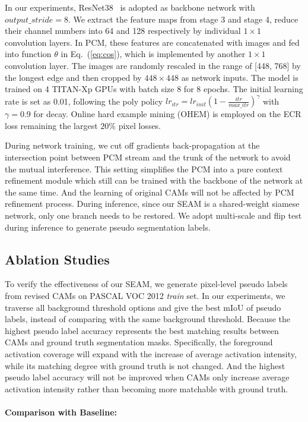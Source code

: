 \documentclass[10pt,twocolumn,letterpaper]{article}
\begin{document}
	In our experiments, ResNet38~\cite{resnet38} is adopted as backbone network with $output\_stride=8$. We extract the feature maps from stage 3 and stage 4, reduce their channel numbers into 64 and 128 respectively by individual $1\times 1$ convolution layers. In PCM, these features are concatenated with images and fed into function $\theta$ in Eq.~(\ref{eq:cos}), which is implemented by another $1\times 1$ convolution layer. The images are randomly rescaled in the range of [448, 768] by the longest edge and then cropped by $448\times 448$ as network inputs. The model is trained on 4 TITAN-Xp GPUs with batch size 8 for 8 epochs. The initial learning rate is set as 0.01, following the poly policy $\mathit{lr}_{\mathit{itr}}=\mathit{lr}_{\mathit{init}}(1-\frac{itr}{\mathit{max\_itr}})^\gamma$ with $\gamma=0.9$ for decay. Online hard example mining (OHEM) is employed on the ECR loss remaining the largest $20\%$ pixel losses.

	During network training, we cut off gradients back-propagation at the intersection point between PCM stream and the trunk of the network to avoid the mutual interference. This setting simplifies the PCM into a pure context refinement module which still can be trained with the backbone of the network at the same time. And the learning of original CAMs will not be affected by PCM refinement process. During inference, since our SEAM is a shared-weight siamese network, only one branch needs to be restored. We adopt multi-scale and flip test during inference to generate pseudo segmentation labels.
	
	\subsection{Ablation Studies}
	To verify the effectiveness of our SEAM, we generate pixel-level pseudo labels from revised CAMs on PASCAL VOC 2012 \textit{train} set. In our experiments, we traverse all background threshold options and give the best mIoU of pseudo labels, instead of comparing with the same background threshold. Because the highest pseudo label accuracy represents the best matching results between CAMs and ground truth segmentation masks. Specifically, the foreground activation coverage will expand with the increase of average activation intensity, while its matching degree with ground truth is not changed. And the highest pseudo label accuracy will not be improved when CAMs only increase average activation intensity rather than becoming more matchable with ground truth.
\paragraph{Comparison with Baseline:} 
	
\end{document}
